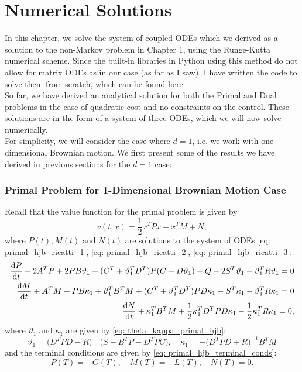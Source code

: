 \chapter{Numerical Solutions} \label{sec: Numerical Solutions}
In this chapter, we solve the system of coupled ODEs which we derived as a solution to the non-Markov problem in Chapter 1, using the Runge-Kutta numerical scheme. Since the built-in libraries in Python using this method do not allow for matrix ODEs as in our case (as far as I saw), I have written the code to solve them from scratch, which can be found here \cite{kirev2023github}.\\

So far, we have derived an analytical solution for both the Primal and Dual problems in the case of quadratic cost and no constraints on the control. These solutions are in the form of a system of three ODEs, which we will now solve numerically. \\

For simplicity, we will consider the case where $d=1$, i.e. we work with one-dimensional Brownian motion. We first present some of the results we have derived in previous sections for the $d=1$ case:



\subsection{Primal Problem for 1-Dimensional Brownian Motion Case}
Recall that the value function for the primal problem is given by
\begin{equation*}
    v(t, x) = \frac12 x^T P x + x^T M + N,
\end{equation*}
where $P(t), M(t)$ and $N(t)$ are solutions to the system of ODEs \eqref{eq: primal_hjb_ricatti_1}, \eqref{eq: primal_hjb_ricatti_2}, \eqref{eq: primal_hjb_ricatti_3}:
\begin{align*}
     \frac{\mathop{}\!\mathrm{d} P}{\mathop{}\!\mathrm{d} t} +  2A^T P +  2P B \vartheta_1 +  (C^T + \vartheta_1^T D^T)P(C + D \vartheta_1)
     -  Q -   2S^T \vartheta_1 -  \vartheta_1^T R \vartheta_1 = 0 \\
     \frac{\mathop{}\!\mathrm{d} M}{\mathop{}\!\mathrm{d} t} + A^T M + P B \kappa_1 + \vartheta_1^T B^T M +  (C^T + \vartheta_1^T D^T)P D \kappa_1 -  S^T \kappa_1 - \vartheta_1^T R \kappa_1 = 0 \\ 
     \frac{\mathop{}\!\mathrm{d} N}{\mathop{}\!\mathrm{d} t} + \kappa_1^T B^T M + \frac12  \kappa_1^T D^T P D \kappa_1 - \frac12 \kappa_1^T R \kappa_1 = 0,
\end{align*}
where $\vartheta_1$ and $\kappa_1$ are given by \eqref{eq: theta_kappa_primal_hjb}:
\begin{equation*}
    \vartheta_1 = \big( D^T P D - R\big)^{-1} \big(S - B^T P -  D^T P C \big), \quad \kappa_1 = -\big( D^T P D + R\big)^{-1} B^T M 
\end{equation*}
and the terminal conditions are given by \eqref{eq: primal_hjb_terminal_conds}:
\begin{equation}
    P(T) = -G(T), \quad M(T) = - L(T), \quad N(T) = 0.
\end{equation}

